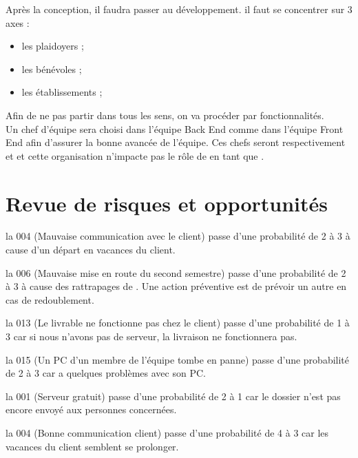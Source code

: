 \documentclass [a4paper] {article}
\begin{document}
\indent
Après la conception, il faudra passer au développement. il faut se concentrer sur 3 axes : 
\begin{itemize}
\item les plaidoyers ;
\item les bénévoles ;
\item les établissements ;
\end{itemize}
Afin de ne pas partir dans tous les sens, on va procéder par fonctionnalités. \\

\indent
Un chef d'équipe sera choisi dans l'équipe Back End comme dans l'équipe Front End afin d'assurer la bonne avancée de l'équipe. Ces chefs seront respectivement \Florian{} et \Julie{} et cette organisation n'impacte pas le rôle de \Michel{} en tant que \RD{}.



\section{Revue de risques et opportunités}

la \FDR{} 004 (Mauvaise communication avec le client) passe d'une probabilité de 2 à 3 à cause d'un départ en vacances du client.



la \FDR{} 006 (Mauvaise mise en route du second semestre) passe d'une probabilité de 2 à 3 à cause des rattrapages de \Pierre. Une action préventive est de prévoir un autre \CP{} en cas de redoublement.

la \FDR{} 013 (Le livrable ne fonctionne pas chez le client) passe d'une probabilité de 1 à 3 car si nous n'avons pas de serveur, la livraison ne fonctionnera pas.

la \FDR{} 015 (Un PC d’un membre de l’équipe tombe en panne) passe d'une probabilité de 2 à 3 car \Florian{} a quelques problèmes avec son PC.

la \FDO{} 001 (Serveur gratuit) passe d'une probabilité de 2 à 1 car le dossier n'est pas encore envoyé aux personnes concernées.

la \FDO{} 004 (Bonne communication client) passe d'une probabilité de 4 à 3 car les vacances du client semblent se prolonger.
 



\end{document}
